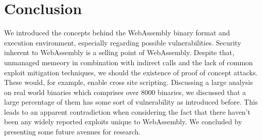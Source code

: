 \documentclass[sigconf]{acmart}
\begin{document}
\section{Conclusion}
We introduced the concepts behind the WebAssembly binary format and execution environment, especially regarding possible vulnerabilities. Security inherent to WebAssembly is a selling point of WebAssembly. Despite that, unmanaged memeory in combination with indirect calls and the lack of common exploit mitigation techniques, we should the existence of proof of concept attacks. These would, for example, enable cross site scripting. Discussing a large analysis on real world binaries which comprises over 8000 binaries, we discussed that a large percentage of them has some sort of vulnerability as introduced before. This leads to an apparent contradiction when considering the fact that there haven't been any widely reported exploits unique to WebAssembly. We concluded by presenting some future avenues for research. 




\appendix
\end{document}
